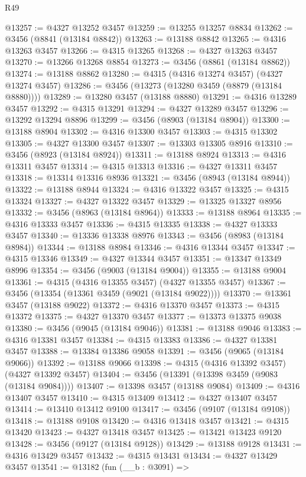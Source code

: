 \begin{lexlean}{R49}
\begin{coremodule}
@13257 := @4327 @13252 @3457
@13259 := @13255 @13257 @8834
@13262 := @3456 (@8841 (@13184 @8842))
@13263 := @13188 @8842
@13265 := @4316 @13263 @3457
@13266 := @4315 @13265
@13268 := @4327 @13263 @3457
@13270 := @13266 @13268 @8854
@13273 := @3456 (@8861 (@13184 @8862))
@13274 := @13188 @8862
@13280 := @4315 (@4316 @13274 @3457) (@4327 @13274 @3457)
@13286 := @3456 (@13273 (@13280 @3459 (@8879 (@13184 @8880))))
@13289 := @13280 @3457 (@13188 @8880)
@13291 := @4316 @13289 @3457
@13292 := @4315 @13291
@13294 := @4327 @13289 @3457
@13296 := @13292 @13294 @8896
@13299 := @3456 (@8903 (@13184 @8904))
@13300 := @13188 @8904
@13302 := @4316 @13300 @3457
@13303 := @4315 @13302
@13305 := @4327 @13300 @3457
@13307 := @13303 @13305 @8916
@13310 := @3456 (@8923 (@13184 @8924))
@13311 := @13188 @8924
@13313 := @4316 @13311 @3457
@13314 := @4315 @13313
@13316 := @4327 @13311 @3457
@13318 := @13314 @13316 @8936
@13321 := @3456 (@8943 (@13184 @8944))
@13322 := @13188 @8944
@13324 := @4316 @13322 @3457
@13325 := @4315 @13324
@13327 := @4327 @13322 @3457
@13329 := @13325 @13327 @8956
@13332 := @3456 (@8963 (@13184 @8964))
@13333 := @13188 @8964
@13335 := @4316 @13333 @3457
@13336 := @4315 @13335
@13338 := @4327 @13333 @3457
@13340 := @13336 @13338 @8976
@13343 := @3456 (@8983 (@13184 @8984))
@13344 := @13188 @8984
@13346 := @4316 @13344 @3457
@13347 := @4315 @13346
@13349 := @4327 @13344 @3457
@13351 := @13347 @13349 @8996
@13354 := @3456 (@9003 (@13184 @9004))
@13355 := @13188 @9004
@13361 := @4315 (@4316 @13355 @3457) (@4327 @13355 @3457)
@13367 := @3456 (@13354 (@13361 @3459 (@9021 (@13184 @9022))))
@13370 := @13361 @3457 (@13188 @9022)
@13372 := @4316 @13370 @3457
@13373 := @4315 @13372
@13375 := @4327 @13370 @3457
@13377 := @13373 @13375 @9038
@13380 := @3456 (@9045 (@13184 @9046))
@13381 := @13188 @9046
@13383 := @4316 @13381 @3457
@13384 := @4315 @13383
@13386 := @4327 @13381 @3457
@13388 := @13384 @13386 @9058
@13391 := @3456 (@9065 (@13184 @9066))
@13392 := @13188 @9066
@13398 := @4315 (@4316 @13392 @3457) (@4327 @13392 @3457)
@13404 := @3456 (@13391 (@13398 @3459 (@9083 (@13184 @9084))))
@13407 := @13398 @3457 (@13188 @9084)
@13409 := @4316 @13407 @3457
@13410 := @4315 @13409
@13412 := @4327 @13407 @3457
@13414 := @13410 @13412 @9100
@13417 := @3456 (@9107 (@13184 @9108))
@13418 := @13188 @9108
@13420 := @4316 @13418 @3457
@13421 := @4315 @13420
@13423 := @4327 @13418 @3457
@13425 := @13421 @13423 @9120
@13428 := @3456 (@9127 (@13184 @9128))
@13429 := @13188 @9128
@13431 := @4316 @13429 @3457
@13432 := @4315 @13431
@13434 := @4327 @13429 @3457
@13541 := @13182
    (fun (__b : @3091) =>

\end{coremodule}
\end{lexlean}
